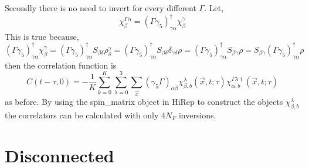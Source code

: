 \documentclass[3p,preprint]{elsarticle}
\begin{document}
Secondly there is no need to invert for every different $\Gamma$. 
Let,
\begin{equation}
\chi^{\Gamma \alpha}_\beta = (\Gamma \gamma_5)^\dagger_{\gamma \alpha} \chi^{\gamma}_\beta
\end{equation}
This is true because,
\begin{equation}
(\Gamma \gamma_5)^\dagger_{\gamma \alpha} \chi^{\gamma}_\beta = (\Gamma \gamma_5)^\dagger_{\gamma \alpha}
S_{\beta \delta} \rho^{\gamma}_\delta = (\Gamma \gamma_5)^\dagger_{\gamma \alpha}
S_{\beta \delta} \delta_{\gamma \delta} \rho = (\Gamma \gamma_5)^\dagger_{\gamma \alpha}
S_{\beta \gamma} \rho = S_{\beta \gamma} (\Gamma \gamma_5)^\dagger_{\gamma \alpha} \rho 
\end{equation}
then the correlation function is
\begin{equation}
C(t - \tau, 0) = -\frac{1}{K} \sum_{k = 0}^{K} \sum_{\lambda = 0}^{3}\sum_{\vec{x} } (\gamma_5 \Gamma)_{\alpha \beta} \chi^{\lambda}_{\beta, b}(\vec{x}, t; \tau) \chi^{\Gamma \lambda \dagger}_{\alpha, b}(\vec{x}, t; \tau) 
\end{equation}
as before. By using the spin\_matrix object in HiRep to construct the objects $\chi^{\lambda}_{\beta, b}$ the correlators can
be calculated with only $4 N_F$ inversions.


\section{Disconnected}
\end{document}
